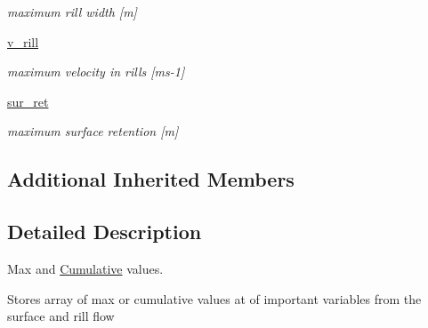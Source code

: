 \begin{DoxyCompactItemize}
\begin{DoxyCompactList}\small\item\em maximum rill width \mbox{[}m\mbox{]} \end{DoxyCompactList}\item 
\hypertarget{classmain__src_1_1main__classes_1_1CumulativeMax_1_1Cumulative_a7436bf8eb0b21d9ee30fcd2d869b193d}{\hyperlink{classmain__src_1_1main__classes_1_1CumulativeMax_1_1Cumulative_a7436bf8eb0b21d9ee30fcd2d869b193d}{v\-\_\-rill}}\label{classmain__src_1_1main__classes_1_1CumulativeMax_1_1Cumulative_a7436bf8eb0b21d9ee30fcd2d869b193d}

\begin{DoxyCompactList}\small\item\em maximum velocity in rills \mbox{[}ms-\/1\mbox{]} \end{DoxyCompactList}\item 
\hypertarget{classmain__src_1_1main__classes_1_1CumulativeMax_1_1Cumulative_ac88f30739d33477a00df683b2b41a03c}{\hyperlink{classmain__src_1_1main__classes_1_1CumulativeMax_1_1Cumulative_ac88f30739d33477a00df683b2b41a03c}{sur\-\_\-ret}}\label{classmain__src_1_1main__classes_1_1CumulativeMax_1_1Cumulative_ac88f30739d33477a00df683b2b41a03c}

\begin{DoxyCompactList}\small\item\em maximum surface retention \mbox{[}m\mbox{]} \end{DoxyCompactList}\end{DoxyCompactItemize}
\subsection*{Additional Inherited Members}


\subsection{Detailed Description}
Max and \hyperlink{classmain__src_1_1main__classes_1_1CumulativeMax_1_1Cumulative}{Cumulative} values. 

Stores array of max or cumulative values at of important variables from the surface and rill flow 

